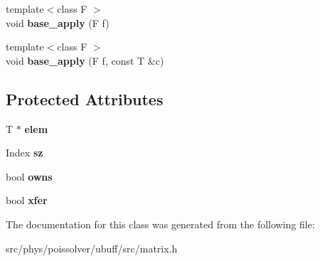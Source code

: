 \begin{DoxyCompactItemize}
\item 
{\footnotesize template$<$class F $>$ }\\void {\bfseries base\+\_\+apply} (F f)\hypertarget{classcpt_1_1Matrix__base_a099da1a3e97181ef68a29ca8d85dff64}{}\label{classcpt_1_1Matrix__base_a099da1a3e97181ef68a29ca8d85dff64}

\item 
{\footnotesize template$<$class F $>$ }\\void {\bfseries base\+\_\+apply} (F f, const T \&c)\hypertarget{classcpt_1_1Matrix__base_abae428fb8f36462f07f5bbbcaf0b15c0}{}\label{classcpt_1_1Matrix__base_abae428fb8f36462f07f5bbbcaf0b15c0}

\end{DoxyCompactItemize}
\subsection*{Protected Attributes}
\begin{DoxyCompactItemize}
\item 
T $\ast$ {\bfseries elem}\hypertarget{classcpt_1_1Matrix__base_ac3793c5627ead10370c13fdd52d7df9d}{}\label{classcpt_1_1Matrix__base_ac3793c5627ead10370c13fdd52d7df9d}

\item 
Index {\bfseries sz}\hypertarget{classcpt_1_1Matrix__base_a0269b11b660187225921e3c8899ec00c}{}\label{classcpt_1_1Matrix__base_a0269b11b660187225921e3c8899ec00c}

\item 
bool {\bfseries owns}\hypertarget{classcpt_1_1Matrix__base_af984705643218b64febebb53898c269f}{}\label{classcpt_1_1Matrix__base_af984705643218b64febebb53898c269f}

\item 
bool {\bfseries xfer}\hypertarget{classcpt_1_1Matrix__base_a836898f46eba05274d9221567111e4b5}{}\label{classcpt_1_1Matrix__base_a836898f46eba05274d9221567111e4b5}

\end{DoxyCompactItemize}


The documentation for this class was generated from the following file\+:\begin{DoxyCompactItemize}
\item 
src/phys/poissolver/ubuff/src/matrix.\+h\end{DoxyCompactItemize}
